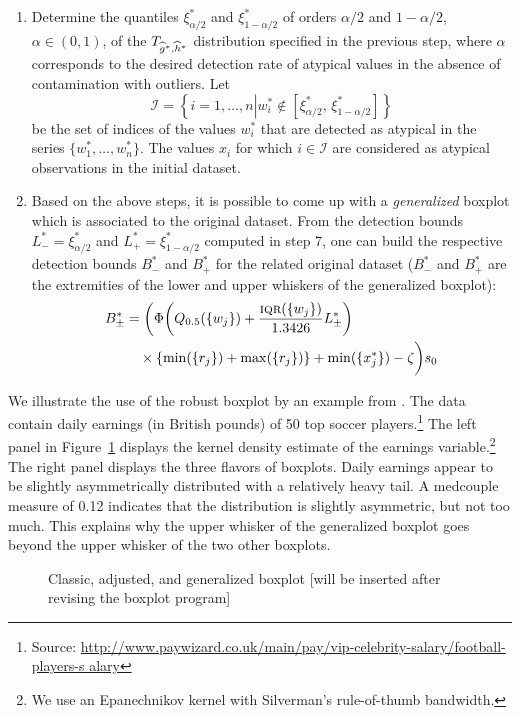 \begin{enumerate}
    \item Determine the quantiles $\xi^*_{\alpha/2}$ and $\xi^*_{1-\alpha/2}$ 
    of orders $\alpha/2$ and $1-\alpha/2$, $\alpha \in (0, 1)$, of the 
    $T_{\widehat{g}^*,\widehat{h}^*}$ distribution specified in the previous step, 
    where $\alpha$ corresponds to the desired detection rate of atypical values 
    in the absence of contamination with outliers. Let 
    \[
    \mathcal{I} = \left\{i=1, \dots, n 
        \left| w^*_i \notin \left[\xi^*_{\alpha/2},\, \xi^*_{1-\alpha/2}\right] \right.
        \right\}
    \] 
     be the set of indices of the values $w_i^{\ast}$ that are detected as
     atypical in the series $\{w^*_1, \dots, w^*_n\}$. The values $x_i$ for
     which $i \in \mathcal{I}$ are considered as atypical observations in the
     initial dataset.

     \item Based on the above steps, it is possible to come up with a
     \emph{generalized} boxplot which is associated to the original dataset.
     From the detection bounds $L^*_{-} = \xi^*_{\alpha/2}$ and $L^*_{+} =
     \xi^*_{1-\alpha/2}$ computed in step 7, one can build the respective
     detection bounds $B^*_{-}$ and $B^*_{+}$ for the related original dataset
     ($B^*_{-}$ and $B^*_{+}$ are the extremities of the lower and upper
     whiskers of the generalized boxplot):
     \begin{align*}
     B^*_{\pm} &= 
         \biggl(\Phi\left(Q_{0.5}(\{w_j\}) + \frac{\stsc{IQR}(\{w_j\})}{1.3426} L^*_{\pm}\right)
         \\
         &\quad \times \left\{\min(\{r_j\})+\max(\{r_j\})\right\}  + \min(\{x^*_j\}) - \zeta\biggr) s_0
     \end{align*}
\end{enumerate}


\begin{stexample}
We illustrate the use of the robust boxplot by an example from
\citealp{Bruffaerts:etal:2014}. The data contain daily earnings (in British
pounds) of 50 top soccer players.\footnote{Source:
\url{http://www.paywizard.co.uk/main/pay/vip-celebrity-salary/football-players-s
alary}} The left panel in Figure~\ref{fig:football} displays the kernel density
estimate of the earnings variable.\footnote{We use an Epanechnikov kernel with
Silverman's rule-of-thumb bandwidth.} The right panel displays the three
flavors of boxplots. Daily earnings appear to be slightly asymmetrically
distributed with a relatively heavy tail. A medcouple measure of 0.12 indicates
that the distribution is slightly asymmetric, but not too much. This explains
why the upper whisker of the generalized boxplot goes beyond the upper whisker
of the two other boxplots.
\end{stexample}


\begin{figure}[h!]
    \centering
    \caption{Classic, adjusted, and generalized boxplot \alert{[will be inserted after revising the boxplot program]}}
    \label{fig:football}
\end{figure}
